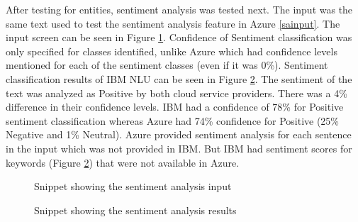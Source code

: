 After testing for entities, sentiment analysis was tested next. The input was the same text used to test the sentiment analysis feature in Azure \ref{sainput}. The input screen can be seen in Figure \ref{ibmsaip}. Confidence of Sentiment classification was only specified for classes identified, unlike Azure which had confidence levels mentioned for each of the sentiment classes (even if it was 0\%). Sentiment classification results of IBM \acs{NLU} can be seen in Figure \ref{ibmsaop}. The sentiment of the text was analyzed as Positive by both cloud service providers. There was a 4\% difference in their confidence levels. IBM had a confidence of 78\% for Positive sentiment classification whereas Azure had 74\% confidence for Positive (25\% Negative and 1\% Neutral). Azure provided sentiment analysis for each sentence in the input which was not provided in IBM. But IBM had sentiment scores for keywords (Figure \ref{ibmsaop}) that were not available in Azure.
\begin {figure}[h!h]
    \centering
    \caption{Snippet showing the sentiment analysis input}
    \label{ibmsaip}
\end {figure}
\begin {figure}[h!h]
    \centering
    \caption{Snippet showing the sentiment analysis results}
    \label{ibmsaop}
\end {figure}

